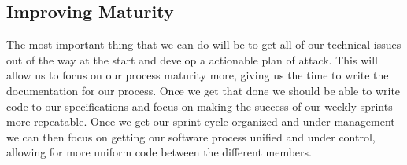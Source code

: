\documentclass[11pt, indentfirst]{article}
\begin{document}
  \subsection{Improving Maturity}

  The most important thing that we can do will be to get all of our technical issues out of the way at the start and develop a actionable plan of attack.
  This will allow us to focus on our process maturity more, giving us the time to write the documentation for our process. Once we get that done we should be able
  to write code to our specifications and focus on making the success of our weekly sprints more repeatable. Once we get our sprint cycle organized and under management
  we can then focus on getting our software process unified and under control, allowing for more uniform code between the different members.
\end{document}
